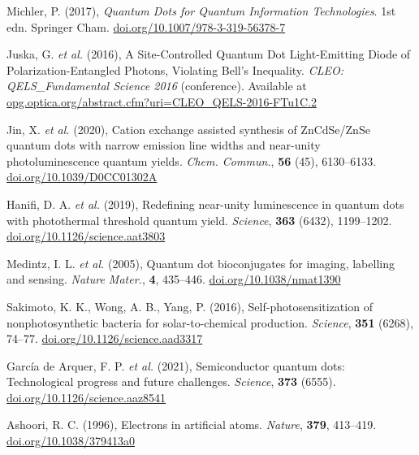 \documentclass[12pt]{article}
\numberwithin{equation}{section}
\begin{document}
\begin{thebibliography}{10}

Michler, P. (2017), \textit{Quantum Dots for Quantum Information Technologies}. 1st edn. Springer Cham. \href{https://doi.org/10.1007/978-3-319-56378-7}{doi.org/10.1007/978-3-319-56378-7}

Juska, G. \textit{et al.} (2016), A Site-Controlled Quantum Dot Light-Emitting Diode of Polarization-Entangled Photons, Violating Bell's Inequality. \textit{CLEO: QELS\_Fundamental Science 2016} (conference). Available at \href{https://opg.optica.org/abstract.cfm?uri=CLEO\_QELS-2016-FTu1C.2}{opg.optica.org/abstract.cfm?uri=CLEO\_QELS-2016-FTu1C.2}

Jin, X. \textit{et al.} (2020), Cation exchange assisted synthesis of ZnCdSe/ZnSe quantum dots with narrow emission line widths and near-unity photoluminescence quantum yields. \textit{Chem. Commun.}, \textbf{56} (45), 6130--6133. \href{https://doi.org/10.1039/D0CC01302A}{doi.org/10.1039/D0CC01302A}

Hanifi, D. A. \textit{et al.} (2019), Redefining near-unity luminescence in quantum dots with photothermal threshold quantum yield. \textit{Science}, \textbf{363} (6432), 1199--1202. \href{https://doi.org/10.1126/science.aat3803}{doi.org/10.1126/science.aat3803}

Medintz, I. L. \textit{et al.} (2005),
Quantum dot bioconjugates for imaging, labelling and sensing. \textit{Nature Mater.}, \textbf{4}, 435--446. \href{https://doi.org/10.1038/nmat1390}{doi.org/10.1038/nmat1390}

Sakimoto, K. K., Wong, A. B., Yang, P. (2016), Self-photosensitization
of nonphotosynthetic bacteria for solar-to-chemical production. \textit{Science}, \textbf{351} (6268), 74--77. \href{https://doi.org/10.1126/science.aad3317}{doi.org/10.1126/science.aad3317}

García de Arquer, F. P. \textit{et al.} (2021), Semiconductor quantum dots: Technological progress and future challenges. \textit{Science}, \textbf{373} (6555). \href{https://doi.org/10.1126/science.aaz8541}{doi.org/10.1126/science.aaz8541}

Ashoori, R. C. (1996), Electrons in artificial atoms. \textit{Nature}, \textbf{379}, 413--419. \href{https://doi.org/10.1038/379413a0}{doi.org/10.1038/379413a0}


\end{thebibliography}
\end{document}
